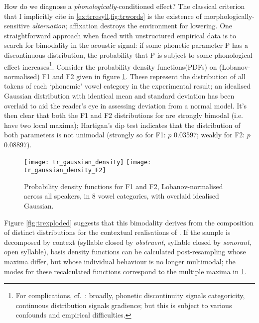 How do we diagnose a \emph{phonologically}-conditioned effect? The classical criterion that I implicitly cite in \cref{ex:trresyll,fig:trwords} is the existence of morphologically-sensitive \emph{alternation}; affixation destroys the environment for lowering. One straightforward approach when faced with unstructured empirical data is to search for bimodality in the acoustic signal: if some phonetic parameter P has a discontinuous distribution, the probability that P is subject to some phonological effect increases\footnote{For complications, cf.~\citet{Scobbie2005}: broadly, phonetic discontinuity signals categoricity, continuous distribution signals gradience; but this is subject to various confounds and empirical difficulties.}. Consider the probability density functions\footnotemark (PDFs) on (Lobanov-normalised) F1 and F2 given in figure \ref{fig:trdensity}. These represent the distribution of all tokens of each `phonemic' vowel category in the experimental result; an idealised Gaussian distribution with identical mean and standard deviation has been overlaid to aid the reader's eye in assessing deviation from a normal model. It's then clear that both the F1 and F2 distributions for  are strongly bimodal (i.e. have two local maxima); Hartigan's dip test indicates that the distribution of both parameters is not unimodal (strongly so for F1: $p$ 0.03597; weakly for F2: $p$ 0.08897).


\begin{figure}[H]
  \texttt{[image: tr\_gaussian\_density]}
  \hfill
  \texttt{[image: tr\_gaussian\_density\_F2]}
  \caption[Probability density functions for F1 and F2, all categories.]{Probability density functions for F1 and F2, Lobanov-normalised across all speakers, in 8 vowel categories, with overlaid idealised Gaussian.}
  \label{fig:trdensity}
\end{figure}

Figure \ref{fig:trexploded} suggests that this bimodality derives from the composition of distinct distributions for the contextual realisations of . If the sample is decomposed by context (syllable closed by {\it obstruent}, syllable closed by {\it sonorant}, open syllable), basis density functions can be calculated post-resampling whose maxima differ, but whose individual behaviour is no longer multimodal; the modes for these recalculated functions correspond to the multiple maxima in \cref{fig:trdensity}.


